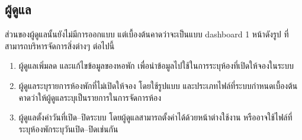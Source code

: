 \subsection{ผู้ดูแล}
ส่วนของผู้ดูแลนั้นยังไม่มีการออกแบบ แต่เบื้องต้นคาดว่าจะเป็นแบบ dashboard 1 หน้าดังรูป ที่สามารถบริหารจัดการสิ่งต่างๆ ต่อไปนี้
\begin{enumerate}
  \item ผู้ดูแลเพิ่มลด และแก้ไขข้อมูลของหอพัก เพื่อนำข้อมูลไปใช้ในการระบุห้องที่เปิดให้จองในระบบ
  \item ผู้ดูแลระบุรายการห้องพักที่ไม่เปิดให้จอง โดยใช้รูปแบบ และประเภทไฟล์ที่ระบบกำหนดเบื้องต้นคาดว่าให้ผู้ดูแลระบุเป็นรายการในการจัดการห้อง
  \item ผู้ดูแลตั้งค่าวันที่เปิด--ปิดระบบ โดยผู้ดูแลสามารถตั้งค่าได้ด้วยหน้าต่างใช้งาน หรืออาจใช้ไฟล์ที่ระบุห้องพักระบุวันเปิด--ปิดเช่นกัน

\end{enumerate}
